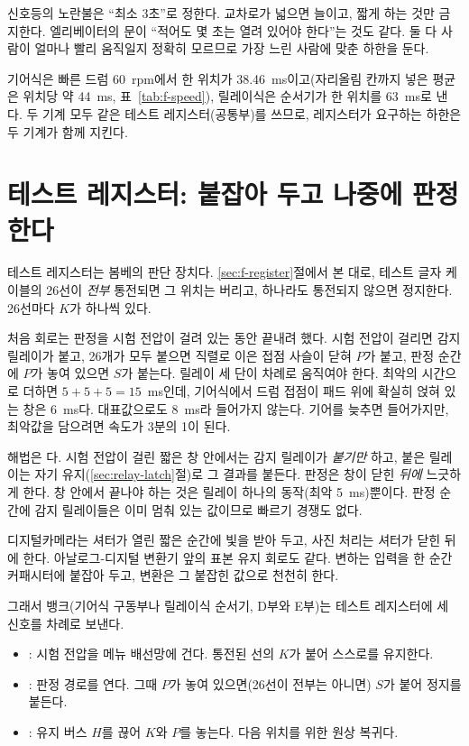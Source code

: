 \General 신호등의 노란불은 ``최소 3초''로 정한다. 교차로가 넓으면 늘이고, 짧게 하는 것만 금지한다. 엘리베이터의
문이 ``적어도 몇 초는 열려 있어야 한다''는 것도 같다. 둘 다 사람이 얼마나 빨리 움직일지 정확히 모르므로
가장 느린 사람에 맞춘 하한을 둔다.

\Ours 기어식은 빠른 드럼 60~rpm에서 한 위치가 38.46~ms이고(자리올림 칸까지 넣은 평균은 위치당 약 44~ms,
표~\ref{tab:f-speed}), 릴레이식은 순서기가 한 위치를 63~ms로 낸다.
두 기계 모두 같은 테스트 레지스터(공통부)를 쓰므로, 레지스터가 요구하는 하한은 두 기계가 함께 지킨다.

\section{테스트 레지스터: 붙잡아 두고 나중에 판정한다}\label{sec:t-register}

테스트 레지스터는 봄베의 판단 장치다. \ref{sec:f-register}절에서 본 대로, 테스트 글자 케이블의 26선이
\emph{전부} 통전되면 그 위치는 버리고, 하나라도 통전되지 않으면 정지한다. 26선마다  $K$가 하나씩 있다.

\Why 처음 회로는 판정을 시험 전압이 걸려 있는 동안 끝내려 했다. 시험 전압이 걸리면 감지 릴레이가 붙고, 26개가
모두 붙으면 직렬로 이은 접점 사슬이 닫혀  $P$가 붙고, 판정 순간에 $P$가 놓여
있으면  $S$가 붙는다. 릴레이 세 단이 차례로 움직여야 한다. 최악의 시간으로 더하면
$5 + 5 + 5 = 15$~ms인데, 기어식에서 드럼 접점이 패드 위에 확실히 얹혀 있는 창은 6~ms다. 대표값으로도
8~ms라 들어가지 않는다. 기어를 늦추면 들어가지만, 최악값을 담으려면 속도가 3분의 1이 된다.

해법은 다. 시험 전압이 걸린 짧은 창 안에서는 감지 릴레이가 \emph{붙기만} 하고,
붙은 릴레이는 자기 유지(\ref{sec:relay-latch}절)로 그 결과를 붙든다. 판정은 창이 닫힌 \emph{뒤에} 느긋하게 한다.
창 안에서 끝나야 하는 것은 릴레이 하나의 동작(최악 5~ms)뿐이다. 판정 순간에 감지 릴레이들은 이미 멈춰 있는
값이므로 빠르기 경쟁도 없다.

\General 디지털카메라는 셔터가 열린 짧은 순간에 빛을 받아 두고, 사진 처리는 셔터가 닫힌 뒤에 한다. 아날로그-디지털
변환기 앞의 표본 유지 회로도 같다. 변하는 입력을 한 순간 커패시터에 붙잡아 두고, 변환은 그 붙잡힌 값으로
천천히 한다.

\Ours 그래서 뱅크(기어식 구동부나 릴레이식 순서기, D부와 E부)는 테스트 레지스터에 세 신호를 차례로 보낸다.

\begin{itemize}
\item {}: 시험 전압을 메뉴 배선망에 건다. 통전된 선의 $K$가 붙어 스스로를 유지한다.
\item {}: 판정 경로를 연다. 그때 $P$가 놓여 있으면(26선이 전부는 아니면) $S$가 붙어 정지를 붙든다.
\item {}: 유지 버스 $H$를 끊어 $K$와 $P$를 놓는다. 다음 위치를 위한 원상 복귀다.
\end{itemize}

